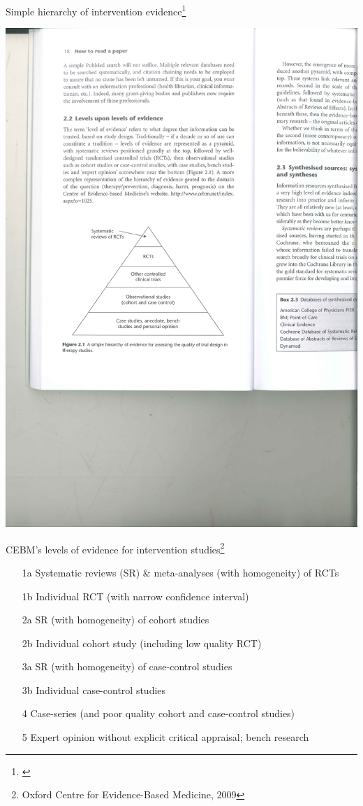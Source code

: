 \documentclass{beamer}
\begin{document}
% 
\begin{frame}{Simple hierarchy of intervention evidence\footnote{\tiny{\citet[p. 18]{Greenhalgh2010}}}}
	\begin{center}
	\includegraphics[width=.9\textwidth]{images/evidence_hierarchy_greenhalgh_4th.pdf}
	\end{center}
\end{frame}

% 
\begin{frame}{CEBM's levels of evidence for intervention studies\footnote{\scriptsize{Oxford Centre for Evidence-Based Medicine, 2009}}}
	\begin{itemize}
	\item[1a] Systematic reviews (SR) \& meta-analyses (with homogeneity) of RCTs
	\item[1b] Individual RCT (with narrow confidence interval)  
	\item[2a] SR (with homogeneity) of cohort studies
	\item[2b] Individual cohort study (including low quality RCT)
	\item[3a] SR (with homogeneity) of case-control studies
	\item[3b] Individual case-control studies
	\item[4] Case-series (and poor quality cohort and case-control studies)
	\item[5] Expert opinion without explicit critical appraisal; bench research
	\end{itemize}
\end{frame}
\end{document}
